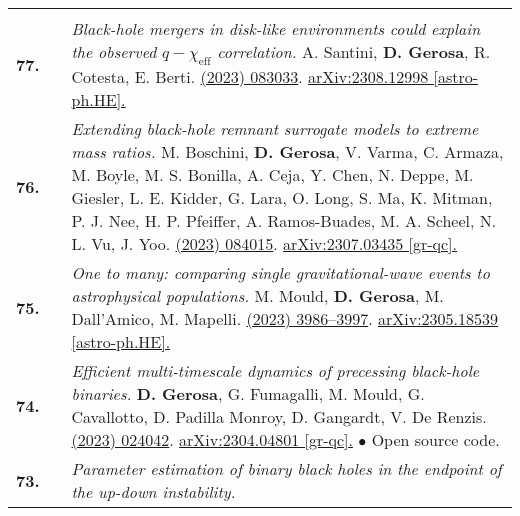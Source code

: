{\begin{longtable}{rp{0.3cm}p{15.8cm}}
\vspace{0.09cm}\\
%
\textbf{77.} & & \textit{Black-hole mergers in disk-like environments could explain the observed $q-\chi_\mathrm{eff}$ correlation.}
\newline{}
A. Santini, \textbf{D. Gerosa}, R. Cotesta, E. Berti.
\newline{}
\href{https://journals.aps.org/prd/abstract/10.1103/PhysRevD.108.083033}{\prd 108 (2023) 083033}. \href{https://arxiv.org/abs/2308.12998}{arXiv:2308.12998 [astro-ph.HE].}
\vspace{0.09cm}\\
%
\textbf{76.} & & \textit{Extending black-hole remnant surrogate models to extreme mass ratios.}
\newline{}
M. Boschini, \textbf{D. Gerosa}, V. Varma, C. Armaza, M. Boyle, M. S. Bonilla, A. Ceja, Y. Chen, N. Deppe, M. Giesler, L. E. Kidder, G. Lara, O. Long, S. Ma, K. Mitman, P. J. Nee, H. P. Pfeiffer, A. Ramos-Buades, M. A. Scheel, N. L. Vu, J. Yoo.
\newline{}
\href{https://journals.aps.org/prd/abstract/10.1103/PhysRevD.108.084015}{\prd 108 (2023) 084015}. \href{https://arxiv.org/abs/2307.03435}{arXiv:2307.03435 [gr-qc].}
\vspace{0.09cm}\\
%
\textbf{75.} & & \textit{One to many: comparing single gravitational-wave events to astrophysical populations.}
\newline{}
M. Mould, \textbf{D. Gerosa}, M. Dall'Amico, M. Mapelli.
\newline{}
\href{https://doi.org/10.1093/mnras/stad2502}{\mnras 525 (2023) 3986–3997}. \href{https://arxiv.org/abs/2305.18539}{arXiv:2305.18539 [astro-ph.HE].}
\vspace{0.09cm}\\
%
\textbf{74.} & & \textit{Efficient multi-timescale dynamics of precessing black-hole binaries.}
\newline{}
\textbf{D. Gerosa}, G. Fumagalli, M. Mould, G. Cavallotto, D. Padilla Monroy, D. Gangardt, V. De Renzis.
\newline{}
\href{https://journals.aps.org/prd/abstract/10.1103/PhysRevD.108.024042}{\prd 108 (2023) 024042}. \href{https://arxiv.org/abs/2304.04801}{arXiv:2304.04801 [gr-qc].}
\newline{}
\textcolor{color1}{$\bullet$} Open source code.
\vspace{0.09cm}\\
%
\textbf{73.} & & \textit{Parameter estimation of binary black holes in the endpoint of the up-down instability.}

\end{longtable}}

